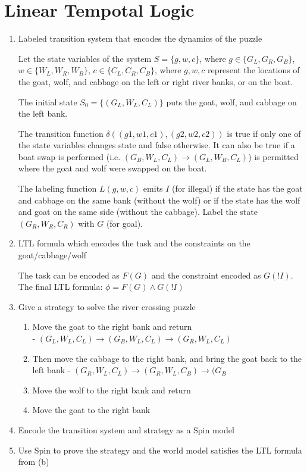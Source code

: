 \section{Linear Tempotal Logic}
\begin{enumerate}[label=(\alph*)]
  \item {\color{blue}Labeled transition system that encodes the dynamics of the puzzle}

    Let the state variables of the system $S = \{g, w, c\}$, where $g \in \{G_L, G_R, G_B\}$, $w \in \{W_L, W_R, W_B\}$, $c \in \{C_L, C_R, C_B\}$, where $g, w, c$ represent the locations of the goat, wolf, and cabbage on the left or right river banks, or on the boat.

    The initial state $S_0 = \{(G_L, W_L, C_L)\}$ puts the goat, wolf, and cabbage on the left bank.

    The transition function $\delta((g1,w1,c1), (g2,w2,c2))$ is true if only one of the state variables changes state and false otherwise. It can also be true if a boat swap is performed (i.e. $(G_B, W_L, C_L) \rightarrow (G_L, W_B, C_L)$) is permitted where the goat and wolf were swapped on the boat.

    The labeling function $L(g, w, c)$ emits $I$ (for illegal) if the state has the goat and cabbage on the same bank (without the wolf) or if the state has the wolf and goat on the same side (without the cabbage). Label the state $(G_R, W_R, C_R)$ with $G$ (for goal).

  \item {\color{blue}LTL formula which encodes the task and the constraints on the goat/cabbage/wolf}


    The task can be encoded as $F(G)$ and the constraint encoded as $G(!I)$. The final LTL formula: $\phi = F(G) \land G(!I)$

  \item {\color{blue}Give a strategy to solve the river crossing puzzle}

    \begin{enumerate}
      \item Move the goat to the right bank and return \\
        - $(G_L, W_L, C_L) \rightarrow (G_B, W_L, C_L) \rightarrow (G_R, W_L, C_L)$
      \item Then move the cabbage to the right bank, and bring the goat back to the left bank
        - $(G_R, W_L, C_L) \rightarrow (G_R, W_L, C_B) \rightarrow (G_B$
      \item Move the wolf to the right bank and return
      \item Move the goat to the right bank
    \end{enumerate}


  \item {\color{blue}Encode the transition system and strategy as a Spin model}

  \item {\color{blue}Use Spin to prove the strategy and the world model satisfies the LTL formula from (b)}
\end{enumerate}

